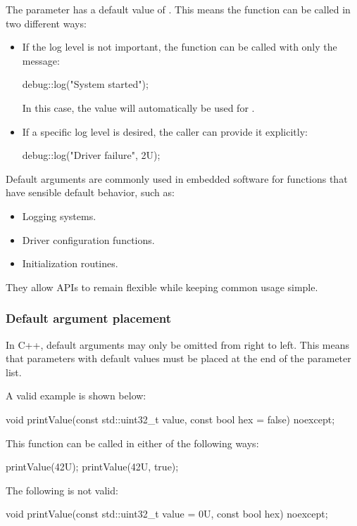 \noindent The parameter  has a default value of . This means the function can
be called in two different ways:
\begin{itemize}
  \item If the log level is not important, the function can be called with only the message:
\begin{cppcode}
debug::log("System started");
\end{cppcode}
    In this case, the value  will automatically be used for .
  \item If a specific log level is desired, the caller can provide it explicitly:
\begin{cppcode}
debug::log("Driver failure", 2U);
\end{cppcode}
\end{itemize}
Default arguments are commonly used in embedded software for functions that have sensible default
behavior, such as:
\begin{itemize}
  \item Logging systems.
  \item Driver configuration functions.
  \item Initialization routines.
\end{itemize}
They allow APIs to remain flexible while keeping common usage simple.

\subsubsection{Default argument placement}
In C++, default arguments may only be omitted from right to left. This means that parameters with
default values must be placed at the end of the parameter list.

A valid example is shown below:

\begin{cppcode}
void printValue(const std::uint32_t value, const bool hex = false) noexcept;
\end{cppcode}

\noindent This function can be called in either of the following ways:

\begin{cppcode}
printValue(42U);
printValue(42U, true);
\end{cppcode}

\noindent The following is not valid:

\begin{cppcode}
void printValue(const std::uint32_t value = 0U, const bool hex) noexcept;
\end{cppcode}

